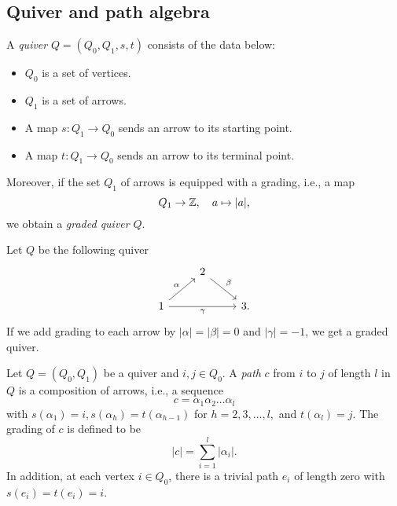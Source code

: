 \subsection{Quiver and path algebra}
\begin{definition}
  A \textit{quiver} $Q =(Q_0,Q_1,s,t)$ consists of the data below:
  \begin{itemize}
    \item $Q_0$ is a set of vertices.
    \item $Q_1$ is a set of arrows.
    \item A map $s \colon Q_1\to Q_0$ sends an arrow to its starting point.
    \item A map $t \colon Q_1\to Q_0$ sends an arrow to its terminal point.
  \end{itemize}
  Moreover, if the set $Q_1$ of arrows is equipped with a grading,
  i.e., a map
  \[ Q_1 \to \mathbb{Z},\quad a \mapsto |a|, \]
  we obtain a \textit{graded quiver} $Q$.
\end{definition}

\begin{example} \label{ex}
  Let $Q$ be the following quiver
  \[
    \begin{tikzcd}
    & 2 \ar[dr, "\beta"] & \\
      1 \ar[ur, "\alpha"] \arrow[rr, "\gamma"'] & & 3.
    \end{tikzcd}
  \]
  If we add grading to each arrow by $|\alpha| = |\beta| = 0$ and $|\gamma| = -1$,
  we get a graded quiver.
\end{example}

Let $Q = (Q_0, Q_1)$ be a quiver and $i, j \in Q_0$.
A \textit{path} $c$ from $i$ to $j$ of length $l$ in $Q$
is a composition of arrows, i.e., a sequence
\[ c = \alpha_1 \alpha_2 \ldots \alpha_l \]
with $s(\alpha_1) = i, s(\alpha_h) = t(\alpha_{h-1})$
for $h =2, 3, \ldots, l,$ and $t(\alpha_l) = j$.
The grading of $c$ is defined to be
\[ |c| = \sum_{i=1}^l |\alpha_i|.  \]
In addition, at each vertex $i \in Q_0$,
there is a trivial path $e_i$ of length zero with $s(e_i) = t(e_i) = i$.

